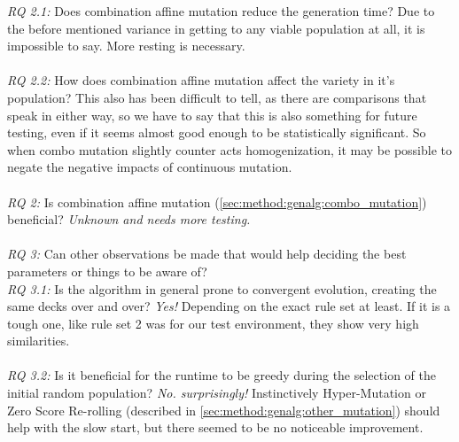 	\emph{RQ 2.1:} Does combination affine mutation reduce the generation time?
	Due to the before mentioned variance in getting to any viable population at all, it is impossible to say. More resting is necessary.
\\
\\
	\emph{RQ 2.2:} How does combination affine mutation affect the variety in it's population?
	This also has been difficult to tell, as there are comparisons that speak in either way, so we have to say that this is also something for future testing, even if it seems almost good enough to be statistically significant. So when combo mutation slightly counter acts homogenization, it may be possible to negate the negative impacts of continuous mutation.
\\
\\
	\emph{RQ 2:} Is combination affine mutation (\ref{sec:method:genalg:combo_mutation}) beneficial?
	\emph{Unknown and needs more testing.}
\\
\\
	\emph{RQ 3:} Can other observations be made that would help deciding the best parameters or things to be aware of?\\
	\emph{RQ 3.1:} Is the algorithm in general prone to convergent evolution, creating the same decks over and over?
	\emph{Yes!} Depending on the exact rule set at least. If it is a tough one, like rule set 2 was for our test environment, they show very high similarities.
\\
\\
	\emph{RQ 3.2:} Is it beneficial for the runtime to be greedy during the selection of the initial random population?
	\emph{No. surprisingly!} Instinctively Hyper-Mutation or Zero Score Re-rolling (described in \ref{sec:method:genalg:other_mutation}) should help with the slow start, but there seemed to be no noticeable improvement. \\
\\
\\


